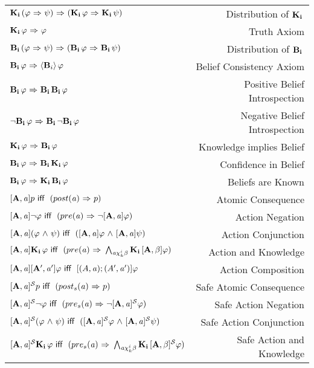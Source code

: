 \begin{table}[H]
\begin{center}
\begin{tabular}{| l r |}
	\hline
    $\Kns{i}(\varphi \iimplies \psi) \iimplies (\Kns{i}\varphi \iimplies \Kns{i}\psi)$ & Distribution of $\Kns{i}$ \\
    $\Kns{i}\varphi \iimplies \varphi$ & Truth Axiom \\
    $\Bels{i}(\varphi \iimplies \psi) \iimplies (\Bels{i}\varphi \iimplies \Bels{i}\psi)$ & Distribution of $\Bels{i}$\\
    $\Bels{i}\varphi \iimplies \BPoss{i}\varphi$ & Belief Consistency Axiom\\
    $\Bels{i}\varphi \iimplies \Bels{i}\Bels{i}\varphi$ & Positive Belief Introspection \\
    $\tlnot\Bels{i}\varphi \iimplies \Bels{i}\tlnot\Bels{i}\varphi$ & Negative Belief Introspection\\
    $\Kns{i}\varphi \iimplies \Bels{i}\varphi$ & Knowledge implies Belief \\
    $\Bels{i}\varphi \iimplies \Bels{i}\Kns{i}\varphi$ & Confidence in Belief\\
    $\Bels{i}\varphi \iimplies \Kns{i}\Bels{i}\varphi$ & Beliefs are Known\\
    $\Pal{A,\laa}p \iiff (post(\laa) \iimplies p)$ & Atomic Consequence\\
    $\Pal{A,\laa}\tlnot \varphi \iiff (pre(\laa) \iimplies \tlnot \Pal{A,\laa}\varphi)$ & Action Negation\\
    $\Pal{A,\laa}(\varphi \tland \psi) \iiff (\Pal{A,\laa}\varphi \tland \Pal{A,\laa}\psi)$ & Action Conjunction\\
    $\Pal{A,\laa}\Kns{i}\varphi \iiff (pre(\laa)\iimplies \bigwedge_{\laa\chi_{k}^i\beta}\Kns{i}\Pal{A,\beta}\varphi)$ & Action and Knowledge\\
    $\Pal{A,\laa}\Pal{A',\laa'}\varphi \iiff [(A,\laa);(A',\laa')]\varphi$ & Action Composition \\
    $\SPal{A,\laa}p \iiff (post_s(\laa) \iimplies p)$ & Safe Atomic Consequence\\
    $\SPal{A,\laa}\tlnot \varphi \iiff (pre_s(\laa) \iimplies \tlnot \SPal{A,\laa}\varphi)$ & Safe Action Negation\\
    $\SPal{A,\laa}(\varphi \tland \psi) \iiff (\SPal{A,\laa}\varphi \tland \SPal{A,\laa}\psi)$ & Safe Action Conjunction\\
    $\SPal{A,\laa}\Kns{i}\varphi \iiff (pre_s(\laa)\iimplies \bigwedge_{\laa\chi_{k}^i\beta}\Kns{i}\SPal{A,\beta}\varphi)$ & Safe Action and Knowledge\\

\end{tabular}
\end{center}
\end{table}
